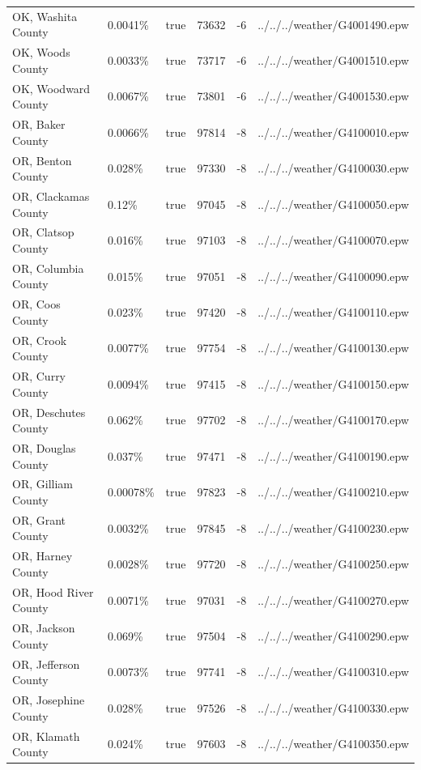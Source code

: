 \begin{longtable}[]{@{}llllll@{}}
OK, Washita County & 0.0041\% & true & 73632 & -6 &
../../../weather/G4001490.epw \\
OK, Woods County & 0.0033\% & true & 73717 & -6 &
../../../weather/G4001510.epw \\
OK, Woodward County & 0.0067\% & true & 73801 & -6 &
../../../weather/G4001530.epw \\
OR, Baker County & 0.0066\% & true & 97814 & -8 &
../../../weather/G4100010.epw \\
OR, Benton County & 0.028\% & true & 97330 & -8 &
../../../weather/G4100030.epw \\
OR, Clackamas County & 0.12\% & true & 97045 & -8 &
../../../weather/G4100050.epw \\
OR, Clatsop County & 0.016\% & true & 97103 & -8 &
../../../weather/G4100070.epw \\
OR, Columbia County & 0.015\% & true & 97051 & -8 &
../../../weather/G4100090.epw \\
OR, Coos County & 0.023\% & true & 97420 & -8 &
../../../weather/G4100110.epw \\
OR, Crook County & 0.0077\% & true & 97754 & -8 &
../../../weather/G4100130.epw \\
OR, Curry County & 0.0094\% & true & 97415 & -8 &
../../../weather/G4100150.epw \\
OR, Deschutes County & 0.062\% & true & 97702 & -8 &
../../../weather/G4100170.epw \\
OR, Douglas County & 0.037\% & true & 97471 & -8 &
../../../weather/G4100190.epw \\
OR, Gilliam County & 0.00078\% & true & 97823 & -8 &
../../../weather/G4100210.epw \\
OR, Grant County & 0.0032\% & true & 97845 & -8 &
../../../weather/G4100230.epw \\
OR, Harney County & 0.0028\% & true & 97720 & -8 &
../../../weather/G4100250.epw \\
OR, Hood River County & 0.0071\% & true & 97031 & -8 &
../../../weather/G4100270.epw \\
OR, Jackson County & 0.069\% & true & 97504 & -8 &
../../../weather/G4100290.epw \\
OR, Jefferson County & 0.0073\% & true & 97741 & -8 &
../../../weather/G4100310.epw \\
OR, Josephine County & 0.028\% & true & 97526 & -8 &
../../../weather/G4100330.epw \\
OR, Klamath County & 0.024\% & true & 97603 & -8 &
../../../weather/G4100350.epw \\

\end{longtable}
